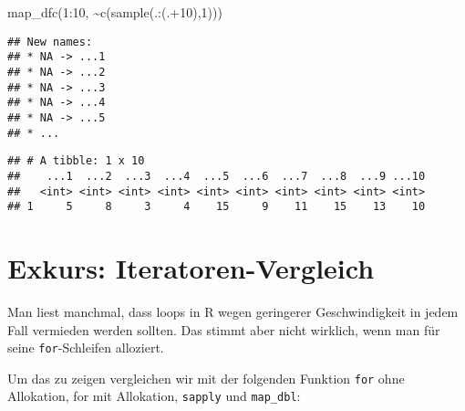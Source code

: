 \documentclass[
]{book}
\newenvironment{Shaded}{\begin{snugshade}}{\end{snugshade}}
\newcommand{\DecValTok}[1]{\textcolor[rgb]{0.00,0.00,0.81}{#1}}
\newcommand{\FunctionTok}[1]{\textcolor[rgb]{0.00,0.00,0.00}{#1}}
\newcommand{\NormalTok}[1]{#1}
\newcommand{\SpecialCharTok}[1]{\textcolor[rgb]{0.00,0.00,0.00}{#1}}
\begin{document}
\begin{Shaded}
\begin{Highlighting}[]
\FunctionTok{map\_dfc}\NormalTok{(}\DecValTok{1}\SpecialCharTok{:}\DecValTok{10}\NormalTok{, }\SpecialCharTok{\textasciitilde{}}\FunctionTok{c}\NormalTok{(}\FunctionTok{sample}\NormalTok{(.}\SpecialCharTok{:}\NormalTok{(.}\SpecialCharTok{+}\DecValTok{10}\NormalTok{),}\DecValTok{1}\NormalTok{)))}
\end{Highlighting}
\end{Shaded}

\begin{verbatim}
## New names:
## * NA -> ...1
## * NA -> ...2
## * NA -> ...3
## * NA -> ...4
## * NA -> ...5
## * ...
\end{verbatim}

\begin{verbatim}
## # A tibble: 1 x 10
##    ...1  ...2  ...3  ...4  ...5  ...6  ...7  ...8  ...9 ...10
##   <int> <int> <int> <int> <int> <int> <int> <int> <int> <int>
## 1     5     8     3     4    15     9    11    15    13    10
\end{verbatim}

\hypertarget{exkurs-iteratoren-vergleich}{%
\section{Exkurs: Iteratoren-Vergleich}\label{exkurs-iteratoren-vergleich}}

Man liest manchmal, dass loops in R wegen geringerer Geschwindigkeit in jedem Fall vermieden werden sollten. Das stimmt aber nicht wirklich, wenn man für seine \texttt{for}-Schleifen alloziert.

Um das zu zeigen vergleichen wir mit der folgenden Funktion \texttt{for} ohne Allokation, for mit Allokation, \texttt{sapply} und \texttt{map\_dbl}:
\end{document}
